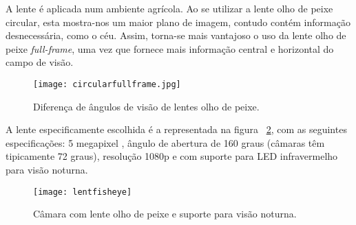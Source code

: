 A lente é aplicada num ambiente agrícola. Ao se utilizar a lente olho de peixe circular, esta mostra-nos um maior plano de imagem, contudo contém informação desnecessária, como o céu. Assim, torna-se mais vantajoso o uso da lente olho de peixe \textit{full-frame}, uma vez que fornece mais informação central e horizontal do campo de visão.

\begin{figure}[h!] %
	\begin{center}
		\leavevmode		
		\texttt{[image: circularfullframe.jpg]}
		\caption{Diferença de ângulos de visão de lentes olho de peixe.}
		\label{fig:circularfullframe}
	\end{center}
\end{figure}


A lente especificamente escolhida é a representada na figura ~\ref{fig:lentfisheye}, com as seguintes especificações: 5 megapixel , ângulo de abertura de 160 graus (câmaras têm tipicamente 72 graus), resolução 1080p e com suporte para LED infravermelho para visão noturna.

\begin{figure}[h!]%
	\begin{center}
		\leavevmode		
		\texttt{[image: lentfisheye]}
		\caption{Câmara com lente olho de peixe e suporte para visão noturna.}
		\label{fig:lentfisheye}
	\end{center}
\end{figure}
